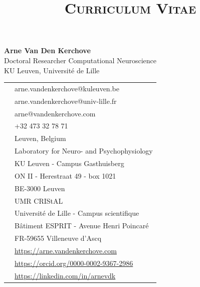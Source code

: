 \documentclass[10pt,a4paper]{article}
\title{\textsc{Curriculum Vitae}}
\date{}
\begin{document}
\maketitle
\begin{minipage}{.75\linewidth}
	\Large \textbf{Arne Van Den Kerchove}\\
	\normalsize Doctoral Researcher Computational Neuroscience\\
	KU Leuven, Université de Lille

	\bigskip

	\begin{tabular}{@{}c l}
		\faAt        & arne.vandenkerchove@kuleuven.be             \\
		\faAt        & arne.vandenkerchove@univ-lille.fr           \\
		\faAt        & arne@vandenkerchove.com                     \\
		\faPhone     & +32 473 32 78 71                            \\
		\faMapMarker & Leuven, Belgium                             \\
		\faMapMarker & Laboratory for Neuro- and Psychophysiology  \\
		             & KU Leuven - Campus Gasthuisberg             \\
		             & ON II - Herestraat 49 - box 1021            \\
		             & BE-3000 Leuven                              \\
		\faMapMarker & UMR CRIStAL                                 \\
		             & Université de Lille - Campus scientifique   \\
		             & Bâtiment ESPRIT - Avenue Henri Poincaré     \\
		             & FR-59655 Villeneuve d'Ascq                  \\
		\faGlobe     & \url{https://arne.vandenkerchove.com}       \\
		\aiOrcid     & \url{https://orcid.org/0000-0002-9367-2986} \\
		\faLinkedin  & \url{https://linkedin.com/in/arnevdk}
	\end{tabular}
\end{minipage}%
\end{document}
